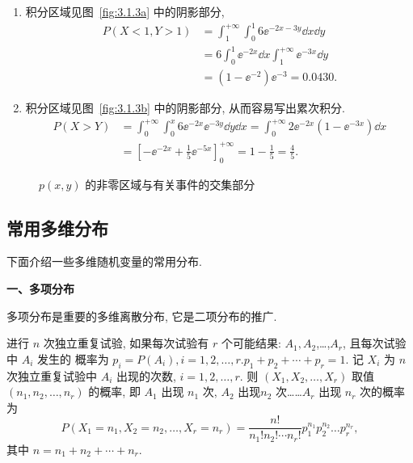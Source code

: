    \begin{solution}
  		\begin{enumerate}
  		\item 积分区域见图~\ref{fig:3.1.3a} 中的阴影部分, 
  		\begin{align*} 
  		 P(X<1, Y>1) &=\int_{1}^{+\infty} \int_{0}^{1} 6 \ee^{-2 x-3 y} \dd x \dd y \\
  		 &=6 \int_{0}^{1} \ee^{-2 x} \dd x \int_{1}^{+\infty} \ee^{-3 x} \dd y \\
  		 &=\left(1-\ee^{-2}\right) \ee^{-3}=0.0430. 
  		\end{align*}
  		\item 积分区域见图~\ref{fig:3.1.3b} 中的阴影部分, 从而容易写出累次积分.
  		\begin{align*} 
  		 P(X>Y) &=\int_{0}^{+\infty} \int_{0}^{x} 6 \ee^{-2 x} \ee^{-3 y} \dd y \dd x=
  		 \int_{0}^{+\infty} 2 \ee^{-2 x}\left(1-\ee^{-3 x}\right) \dd x \\
  		 &=\left[-\ee^{-2 x}+\frac{1}{5} \ee^{-5 x}\right]_{0}^{+\infty}=1-\frac{1}{5}=\frac{4}{5} .
  		\end{align*}
  		\end{enumerate}             
   \end{solution}
   \begin{figure}[htbp]
   \centering
   \qquad
   \caption{$p(x,y)$ 的非零区域与有关事件的交集部分}\label{fig:3.1.3}
   \end{figure}
   
  \subsection{常用多维分布}\label{ssec:3.1.5}
  下面介绍一些多维随机变量的常用分布. 
   
  \textbf{一、多项分布 }
   
  多项分布是重要的多维离散分布, 它是二项分布的推广.
  
  进行 $n$ 次独立重复试验, 如果每次试验有 $r$ 个可能结果: $A_1, A_2$,\ldots,$A_r$, 且每次试验中 $A_i$ 发生的
  概率为 $p_{i}=P\left(A_{i}\right), i=1,2, \ldots, r . p_{1}+p_{2}+\cdots+p_{r}=1$.
  记 $X_i$ 为 $n$ 次独立重复试验中 $A_i$ 出现的次数, $i=1,2,\ldots,r$. 则 $(X_1,X_2,\ldots,X_r)$ 
  取值 $(n_1,n_2,\ldots,n_r)$ 的概率, 即 $A_1$ 出现 $n_1$ 次, $A_2$ 出现$n_2$ 次\ldots\ldots $A_r$ 出现 $n_r$ 次的概率为
  \begin{equation}
	  P\left(X_{1}=n_{1}, X_{2}=n_{2}, \ldots, X_{r}=n_{r}\right)=\frac{n !}{n_{1} ! n_{2} ! \cdots n_{r} !} p_{1}^{n_{1}} p_{2}^{n_{2}} \ldots p_{r}^{n_r},
  \end{equation}
  其中 $n=n_1+n_2+\cdots+n_r$.
  
